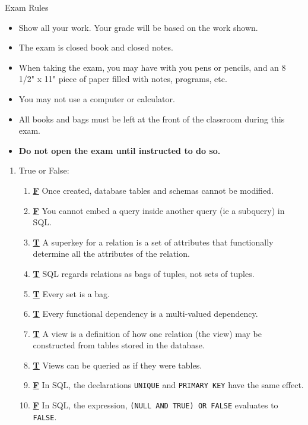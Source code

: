 {\small
{\bf
\begin{center}
Exam Rules
\end{center}
\begin{itemize}
\itemsep=0pt
	\item Show all your work.  Your grade will be based on the work shown.          \item The exam is closed book and closed notes. 
        \item When taking the exam, you may have with you pens or pencils,
		and an 8 1/2" x 11" 
		piece of paper filled with notes, programs, etc. 
	\item You may not use a computer or calculator. 
	\item All books and bags must be left at the front of the classroom 
		during this exam. 
	\item {\bf Do not open the exam until instructed to do so. }
\end{itemize}
}


\begin{enumerate}

    \item True or False: 
    \begin{enumerate}
        \item \underline{\bf F} Once created, database tables
		and schemas cannot be modified.
        \item \underline{\bf F} You cannot embed a query inside
		another query (ie a subquery) in SQL.
        \item \underline{\bf T} A superkey for a relation is a
		set of attributes that functionally determine all the 
		attributes of the relation.
        \item \underline{\bf T} SQL regards relations as bags
		of tuples, not sets of tuples.
        \item \underline{\bf T} Every set is a bag.
        \item \underline{\bf T} Every functional dependency is a 
		multi-valued dependency.
        \item \underline{\bf T} A view is a definition of how
		one relation (the view) may be constructed from tables 
		stored in the database.
        \item \underline{\bf T} Views can be queried as if
		they were tables.
        \item \underline{\bf F} In SQL, the declarations
		{\tt UNIQUE} and {\tt PRIMARY KEY} have the same effect.
        \item \underline{\bf F} In SQL, the expression,
		{\tt (NULL AND TRUE) OR FALSE} evaluates to {\tt FALSE}.
    \end{enumerate}



\end{enumerate}}

